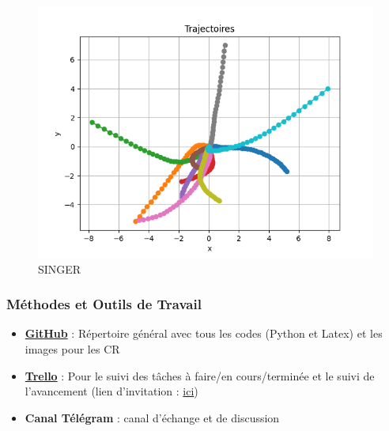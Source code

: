 \documentclass{beamer}
\begin{document}
\begin{frame}
\begin{figure}
\begin{minipage}{0.3\textwidth}
        \centering
        \includegraphics[width=\textwidth]{images/SINGER_Trajectoires.png}
        \caption{SINGER}
    \end{minipage}
\end{figure}
\end{frame}

\begin{frame}
    \frametitle{Méthodes et Outils de Travail}
    \begin{itemize}
        \item \textbf{\href{https://github.com/Feulym/ProjetS8_TRACK_2425}{GitHub}} : Répertoire général avec tous les codes (Python et Latex) et les images pour les CR
        \item \textbf{\href{https://trello.com/b/AcVzNkta/projet-s8-track}{Trello}} : Pour le suivi des tâches à faire/en cours/terminée et le suivi de l'avancement (lien d'invitation : \href{https://trello.com/invite/b/67936f0df0a78c335e0e61e9/ATTIa74f84297b27934504d49c129702a97d20B0A929/projet-s8-track}{ici})
        \item \textbf{Canal Télégram} : canal d'échange et de discussion
    \end{itemize}
\end{frame}
\end{document}
